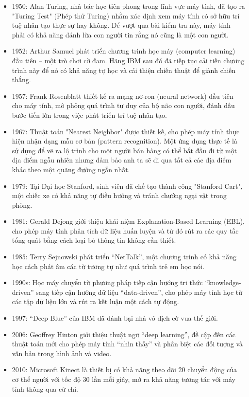 \documentclass[13pt]{article}
\begin{document}
    \begin{itemize}
        \item 1950: Alan Turing, nhà bác học tiên phong trong lĩnh vực máy tính, đã tạo ra "Turing Test" (Phép thử Turing) nhằm xác định xem máy tính có sở hữu trí tuệ nhân tạo thực sự hay không. Để vượt qua bài kiểm tra này, máy tính phải có khả năng đánh lừa con người tin rằng nó cũng là một con người.
        \item 1952: Arthur Samuel phát triển chương trình học máy (computer learning) đầu tiên – một trò chơi cờ đam. Hãng IBM sau đó đã tiếp tục cải tiến chương trình này để nó có khả năng tự học và cải thiện chiến thuật để giành chiến thắng.
        \item 1957: Frank Rosenblatt thiết kế ra mạng nơ-ron (neural network) đầu tiên cho máy tính, mô phỏng quá trình tư duy của bộ não con người, đánh dấu bước tiến lớn trong việc phát triển trí tuệ nhân tạo.
        \item 1967: Thuật toán "Nearest Neighbor" được thiết kế, cho phép máy tính thực hiện nhận dạng mẫu cơ bản (pattern recognition). Một ứng dụng thực tế là sử dụng để vẽ ra lộ trình cho một người bán hàng có thể bắt đầu đi từ một địa điểm ngẫu nhiên nhưng đảm bảo anh ta sẽ đi qua tất cả các địa điểm khác theo một quãng đường ngắn nhất.
        \item 1979: Tại Đại học Stanford, sinh viên đã chế tạo thành công "Stanford Cart", một chiếc xe có khả năng tự điều hướng và tránh chướng ngại vật trong phòng.
        \item 1981: Gerald Dejong giới thiệu khái niệm Explanation-Based Learning (EBL), cho phép máy tính phân tích dữ liệu huấn luyện và từ đó rút ra các quy tắc tổng quát bằng cách loại bỏ thông tin không cần thiết.
        \item 1985: Terry Sejnowski phát triển “NetTalk”, một chương trình có khả năng học cách phát âm các từ tương tự như quá trình trẻ em học nói.
        \item 1990s: Học máy chuyển từ phương pháp tiếp cận hướng tri thức “knowledge-driven” sang tiếp cận hướng dữ liệu “data-driven”, cho phép máy tính học từ các tập dữ liệu lớn và rút ra kết luận một cách tự động.
        \item 1997: “Deep Blue” của IBM đã đánh bại nhà vô địch cờ vua thế giới.
        \item 2006: Geoffrey Hinton giới thiệu thuật ngữ “deep learning”, đề cập đến các thuật toán mới cho phép máy tính “nhìn thấy” và phân biệt các đối tượng và văn bản trong hình ảnh và video.
        \item 2010: Microsoft Kinect là thiết bị có khả năng theo dõi 20 chuyển động của cơ thể người với tốc độ 30 lần mỗi giây, mở ra khả năng tương tác với máy tính thông qua cử chỉ.

\end{itemize}
\end{document}
